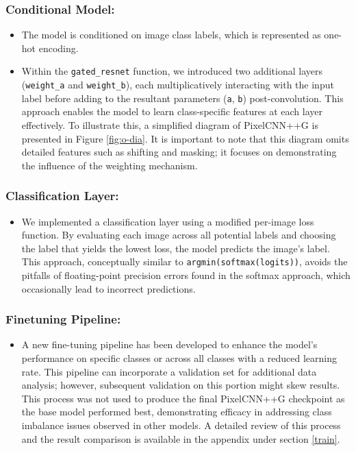 \documentclass{article}
\begin{document}
    \subsubsection{Conditional Model:}
    \begin{itemize}
        \item The model is conditioned on image class labels, which is represented as one-hot encoding.
        \item Within the \texttt{gated\_resnet} function, we introduced two additional layers (\texttt{weight\_a} and \texttt{weight\_b}), each multiplicatively interacting with the input label before adding to the resultant parameters (\texttt{a}, \texttt{b}) post-convolution. This approach enables the model to learn class-specific features at each layer effectively. To illustrate this, a simplified diagram of PixelCNN++G is presented in Figure \ref{fig:o-dia}. It is important to note that this diagram omits detailed features such as shifting and masking; it focuses on demonstrating the influence of the weighting mechanism.
    \end{itemize}

    \subsubsection{Classification Layer:}
    \begin{itemize}
        \item We implemented a classification layer using a modified per-image loss function. By evaluating each image across all potential labels and choosing the label that yields the lowest loss, the model predicts the image's label. This approach, conceptually similar to \texttt{argmin(softmax(logits))}, avoids the pitfalls of floating-point precision errors found in the softmax approach, which occasionally lead to incorrect predictions.
    \end{itemize}

    \subsubsection{Finetuning Pipeline:}
    \begin{itemize}
        \item A new fine-tuning pipeline has been developed to enhance the model's performance on specific classes or across all classes with a reduced learning rate. This pipeline can incorporate a validation set for additional data analysis; however, subsequent validation on this portion might skew results. This process was not used to produce the final PixelCNN++G checkpoint as the base model performed best, demonstrating efficacy in addressing class imbalance issues observed in other models. A detailed review of this process and the result comparison is available in the appendix under section \ref{train}.
    \end{itemize}
\end{document}
